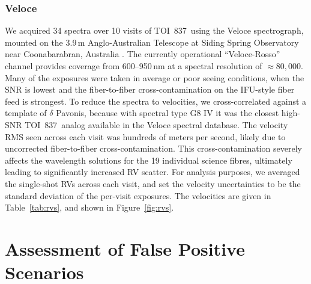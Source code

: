 \documentclass[12pt,twocolumn,tighten]{aastex63}
\newcommand{\tn}{TOI~837} %
\begin{document}
\subsubsection{Veloce}
We acquired 34 spectra over 10 visits of \tn\ using the Veloce
spectrograph, mounted on the 3.9$\,$m Anglo-Australian Telescope at
Siding Spring Observatory near Coonabarabran, Australia
\citep{gilbert_veloce_2018}.  The currently operational
``Veloce-Rosso'' channel provides coverage from 600--950$\,$nm at a
spectral resolution of $\approx 80{,}000$.  Many of the exposures were
taken in average or poor seeing conditions, when the SNR is lowest and
the fiber-to-fiber cross-contamination on the IFU-style fiber feed is
strongest.  To reduce the spectra to velocities, we cross-correlated
against a template of $\delta$ Pavonis, because with spectral type G8
IV it was the closest high-SNR \tn\ analog available in the Veloce
spectral database.  The velocity RMS seen across each visit was
hundreds of meters per second, likely due to uncorrected
fiber-to-fiber cross-contamination.  This cross-contamination severely
affects the wavelength solutions for the 19 individual science fibres,
ultimately leading to significantly increased RV scatter. For analysis
purposes, we averaged the single-shot RVs across each visit, and set
the velocity uncertainties to be the standard deviation of the
per-visit exposures.  The velocities are given in Table~\ref{tab:rvs},
and shown in Figure~\ref{fig:rvs}.




\section{Assessment of False Positive Scenarios}
\label{sec:validation}
\end{document}
